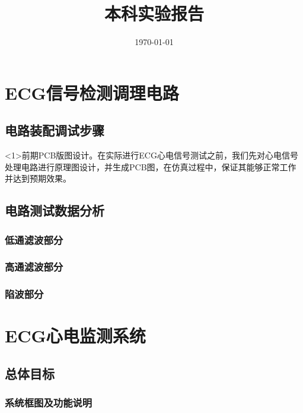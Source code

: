 \documentclass{zjureport}
\title{本科实验报告}
\date{\today}
\begin{document}
	\makecover
	
	\makecontent
	
	
	
	\section{ECG信号检测调理电路}
	
	\subsection{电路装配调试步骤}
	
	<1>前期PCB版图设计。在实际进行ECG心电信号测试之前，我们先对心电信号处理电路进行原理图设计，并生成PCB图，在仿真过程中，保证其能够正常工作并达到预期效果。
	
	\subsection{电路测试数据分析}
	
	\subsubsection{低通滤波部分}
	
	\subsubsection{高通滤波部分}
	
	\subsubsection{陷波部分}
	
	\section{ECG心电监测系统}
	
	\subsection{总体目标}
	
	\subsubsection{系统框图及功能说明}
	
\end{document}
